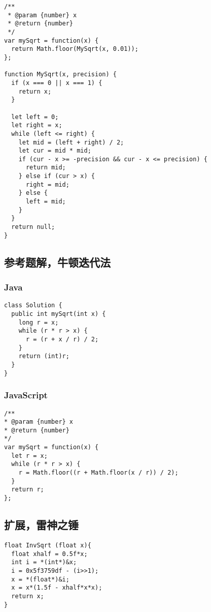 \begin{verbatim}
/**
 * @param {number} x
 * @return {number}
 */
var mySqrt = function(x) {
  return Math.floor(MySqrt(x, 0.01));
};

function MySqrt(x, precision) {
  if (x === 0 || x === 1) {
    return x;
  }

  let left = 0;
  let right = x;
  while (left <= right) {
    let mid = (left + right) / 2;
    let cur = mid * mid;
    if (cur - x >= -precision && cur - x <= precision) {
      return mid;
    } else if (cur > x) {
      right = mid;
    } else {
      left = mid;
    }
  }
  return null;
}
\end{verbatim}

\subsection{参考题解，牛顿迭代法}

\subsubsection{Java}

\begin{verbatim}
class Solution {
  public int mySqrt(int x) {
    long r = x;
    while (r * r > x) {
      r = (r + x / r) / 2;
    }
    return (int)r;
  }
}
\end{verbatim}

\subsubsection{JavaScript}

\begin{verbatim}
/**
* @param {number} x
* @return {number}
*/
var mySqrt = function(x) {
  let r = x;
  while (r * r > x) {
    r = Math.floor((r + Math.floor(x / r)) / 2);
  }
  return r;
};
\end{verbatim}

\subsection{扩展，雷神之锤}

\begin{verbatim}
float InvSqrt (float x){
  float xhalf = 0.5f*x;
  int i = *(int*)&x;
  i = 0x5f3759df - (i>>1);
  x = *(float*)&i;
  x = x*(1.5f - xhalf*x*x);
  return x;
}
\end{verbatim}
